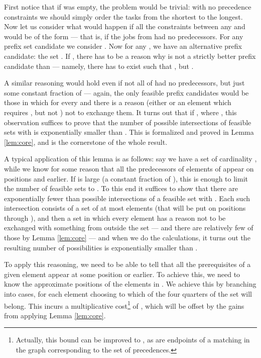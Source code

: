 \documentclass{article}
\theoremstyle{definition}
\begin{document}
First notice that if  was empty, the problem would be trivial: with no
precedence constraints we should simply order the tasks from the shortest to the longest.
Now let us consider what would happen if all the constraints between any  and
 would be of the form  --- that is, if the jobs from  had no predecessors.
For any prefix set candidate  we consider .
Now for any ,  we have an alternative prefix candidate:
the set . If , there has to be a reason
why  is not a strictly better prefix candidate than  --- namely, there has to exist
 such that , but .

A similar reasoning would hold even if not all of  had no predecessors, but just some
constant fraction  of  --- again, the only feasible prefix candidates would be those
in which for every  and  there is a reason (either
 or an element  which requires , but not ) not to exchange them.
It turns out that if , where , this observation suffices
to prove that the number of possible intersections of feasible sets with  is exponentially
smaller than . This is formalized and proved in
Lemma \ref{lem:core}, and is the cornerstone of the whole result.

A typical application of this lemma is as follows: say we have a set  of
cardinality , while
we know for some reason that all the predecessors of elements of  appear on positions
 and earlier. If  is large (a constant fraction of ), this is enough to limit
the number of feasible sets to . To this end it suffices
to show that there are exponentially
fewer than  possible intersections of a feasible set with . Each such intersection
consists of a set of at most  elements (that will be put on positions  through ),
and then a set in which every element has a reason not to be exchanged with something from
outside the set --- and there are relatively few of those by Lemma \ref{lem:core}
--- and when we do the calculations, it turns out the resulting number of
possibilities is exponentially smaller than .

To apply this reasoning, we need to be able to tell that all the prerequisites of a given
element appear at some position or earlier. To achieve this, we need to know the approximate
positions of the elements in . We achieve this by branching into  cases,
for each element  choosing to which of the four quarters of the set
 will  belong. This incurs a multiplicative cost\footnote{Actually, this bound can be improved to , as  are endpoints of a matching in the graph corresponding to the set of precedences.}
of ,
which will be offset by the gains from applying Lemma \ref{lem:core}.
\end{document}
